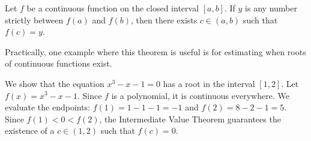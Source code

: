 \documentclass[../calculus.tex]{subfiles}
\begin{document}
\begin{theorem}
    \begin{shaded*}
        Let $f$ be a continuous function on the closed interval $[a,b]$. If $y$ is any number strictly between $f(a)$ and $f(b)$, then there exists $c \in (a,b)$ such that $f(c) = y$.
    \end{shaded*}
\end{theorem}
Practically, one example where this theorem is useful is for estimating when roots of continuous functions exist.

\begin{example}
    We show that the equation $x^3 - x - 1 = 0$ has a root in the interval $[1,2]$. Let $f(x) = x^3 - x - 1$. Since $f$ is a polynomial, it is continuous everywhere. We evaluate the endpoints: $f(1) = 1 - 1 - 1 = -1$ and $f(2) = 8 - 2 - 1 = 5$. Since $f(1) < 0 < f(2)$, the Intermediate Value Theorem guarantees the existence of a $c \in (1,2)$ such that $f(c) = 0$.
\end{example}
\end{document}
